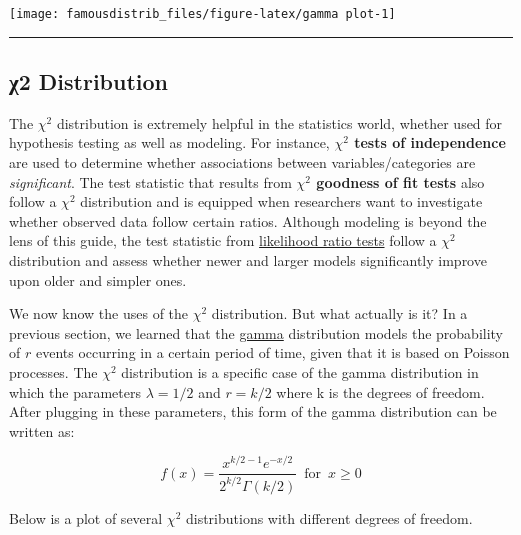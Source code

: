 \documentclass[
]{article}
\begin{document}
\begin{center}\texttt{[image: famousdistrib\_files/figure-latex/gamma plot-1]} \end{center}

\begin{center}\rule{0.5\linewidth}{0.5pt}\end{center}

\hypertarget{ux3c72-distribution}{%
\subsection{χ2 Distribution}\label{ux3c72-distribution}}

The \(\chi^2\) distribution is extremely helpful in the statistics world, whether used for hypothesis testing as well as modeling. For instance, \textbf{\(\chi^2\) tests of independence} are used to determine whether associations between variables/categories are \emph{significant}. The test statistic that results from \textbf{\(\chi^2\) goodness of fit tests} also follow a \(\chi^2\) distribution and is equipped when researchers want to investigate whether observed data follow certain ratios. Although modeling is beyond the lens of this guide, the test statistic from \href{https://www.itl.nist.gov/div898/handbook/apr/section2/apr233.htm}{likelihood ratio tests} follow a \(\chi^2\) distribution and assess whether newer and larger models significantly improve upon older and simpler ones.

We now know the uses of the \(\chi^2\) distribution. But what actually is it? In a previous section, we learned that the \protect\hyperlink{gamma}{gamma} distribution models the probability of \(r\) events occurring in a certain period of time, given that it is based on Poisson processes. The \(\chi^2\) distribution is a specific case of the gamma distribution in which the parameters \(\lambda = 1/2\) and \(r=k/2\) where k is the degrees of freedom. After plugging in these parameters, this form of the gamma distribution can be written as:

\[f(x)=\frac{x^{k/2-1}e^{-x/2}}{2^{k/2}\Gamma(k/2)} \enspace \textrm{for} \enspace x \geq 0\]

Below is a plot of several \(\chi^2\) distributions with different degrees of freedom.
\end{document}
